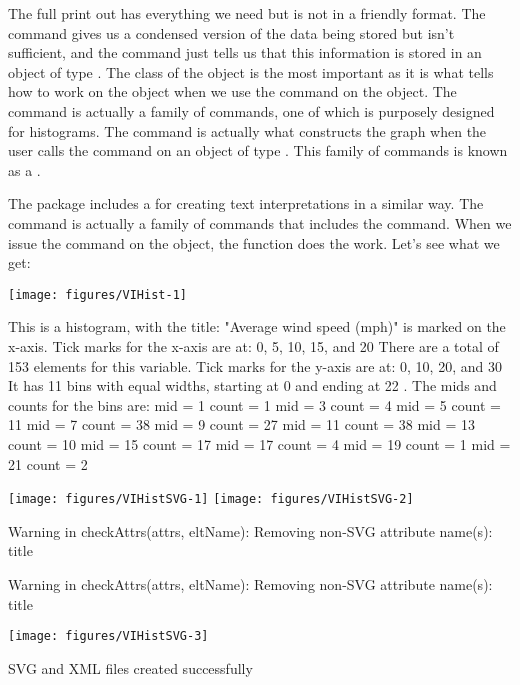 The full print out has everything we need but is not in a friendly format. The  command gives us a condensed version of the data being stored but isn't sufficient, and the  command just tells us that this information is stored in an object of type . The class of the object is the most important as it is what tells \R{} how to work on the object when we use the  command on the  object. The  command is actually a family of commands, one of which is purposely designed for histograms. The  command is actually what constructs the graph when the user calls the  command on an object of type . This family of commands is known as a . 
 
The  package includes a  for creating text interpretations in a similar way. The  command is actually a family of commands that includes the  command. When we issue the  command on the  object, the  function does the work. Let's see what we get: 
\begin{Schunk}

\texttt{[image: figures/VIHist-1]} \begin{Soutput}
This is a histogram, with the title: 
"Average wind speed (mph)" is marked on the x-axis.
Tick marks for the x-axis are at: 0, 5, 10, 15, and 20 
There are a total of 153 elements for this variable.
Tick marks for the y-axis are at: 0, 10, 20, and 30 
It has 11 bins with equal widths, starting at 0 and ending at 22 .
The mids and counts for the bins are:
mid = 1  count = 1 
mid = 3  count = 4 
mid = 5  count = 11 
mid = 7  count = 38 
mid = 9  count = 27 
mid = 11  count = 38 
mid = 13  count = 10 
mid = 15  count = 17 
mid = 17  count = 4 
mid = 19  count = 1 
mid = 21  count = 2
\end{Soutput}
\end{Schunk}
\begin{Schunk}

\texttt{[image: figures/VIHistSVG-1]} 
\texttt{[image: figures/VIHistSVG-2]} \begin{Soutput}
Warning in checkAttrs(attrs, eltName): Removing non-SVG attribute name(s): title
\end{Soutput}
\begin{Soutput}
Warning in checkAttrs(attrs, eltName): Removing non-SVG attribute name(s): title
\end{Soutput}

\texttt{[image: figures/VIHistSVG-3]} \begin{Soutput}
SVG and XML files created successfully
\end{Soutput}
\end{Schunk}
 
